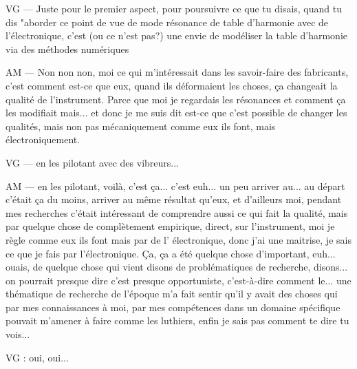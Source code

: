 VG — Juste pour le premier aspect, pour poursuivre ce que tu disais, quand tu dis "aborder ce point de vue de mode résonance de table d'harmonie avec de l'électronique, c'est (ou ce n'est pas?) une envie de modéliser la table d'harmonie via des méthodes numériques

AM — Non non non, moi ce qui m'intéressait dans les savoir-faire des fabricants, c'est comment  est-ce que eux, quand ils déformaient les choses, ça changeait la qualité de l'instrument. Parce que moi je regardais les résonances et comment ça les modifiait mais... et donc je me suis dit est-ce que c'est possible de changer les qualités, mais non pas mécaniquement comme eux ils font, mais électroniquement.

VG — en les pilotant avec des vibreurs... 

AM — en les pilotant, voilà, c'est ça... c'est euh... un peu arriver au... au départ c'était ça du moins, arriver au même résultat qu'eux, et d'ailleurs moi, pendant mes recherches c'était intéressant de comprendre aussi ce qui fait la qualité, mais par quelque chose de complètement empirique, direct, sur l'instrument, moi je règle comme eux ils font mais par de l' électronique, donc j'ai une maitrise, je sais ce que je fais par l'électronique.
Ça, ça a été quelque chose d'important, euh... ouais, de quelque chose qui vient disons de problématiques de recherche, disons... on pourrait presque dire c'est presque opportuniste, c'est-à-dire comment le... une thématique de recherche de l'époque m'a fait sentir qu'il y avait des choses qui par mes connaissances à moi, par mes compétences dans un domaine spécifique pouvait m'amener à faire comme les luthiers, enfin je sais pas comment te dire tu vois... 

VG  : oui, oui... 

